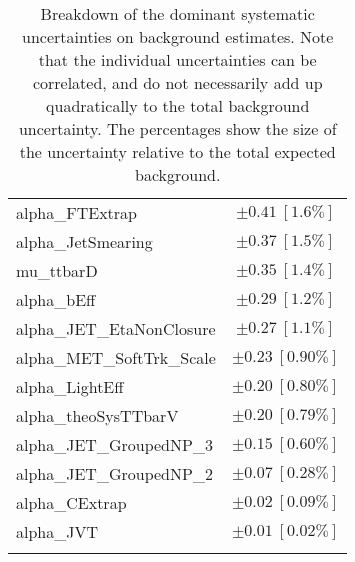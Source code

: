 \begin{table}
\begin{center}
\begin{tabular*}{\textwidth}{@{\extracolsep{\fill}}lc}
alpha\_FTExtrap         & $\pm 0.41\ [1.6\%] $       \\
alpha\_JetSmearing         & $\pm 0.37\ [1.5\%] $       \\
mu\_ttbarD         & $\pm 0.35\ [1.4\%] $       \\
alpha\_bEff         & $\pm 0.29\ [1.2\%] $       \\
alpha\_JET\_EtaNonClosure         & $\pm 0.27\ [1.1\%] $       \\
alpha\_MET\_SoftTrk\_Scale         & $\pm 0.23\ [0.90\%] $       \\
alpha\_LightEff         & $\pm 0.20\ [0.80\%] $       \\
alpha\_theoSysTTbarV         & $\pm 0.20\ [0.79\%] $       \\
alpha\_JET\_GroupedNP\_3         & $\pm 0.15\ [0.60\%] $       \\
alpha\_JET\_GroupedNP\_2         & $\pm 0.07\ [0.28\%] $       \\
alpha\_CExtrap         & $\pm 0.02\ [0.09\%] $       \\
alpha\_JVT         & $\pm 0.01\ [0.02\%] $       \\
\noalign{\smallskip}\hline\noalign{\smallskip}
\end{tabular*}
\end{center}
\caption[Breakdown of uncertainty on background estimates]{
Breakdown of the dominant systematic uncertainties on background estimates.
Note that the individual uncertainties can be correlated, and do not necessarily add up quadratically to 
the total background uncertainty. The percentages show the size of the uncertainty relative to the total expected background.
\label{table.results.bkgestimate.uncertainties.SRD_low}}
\end{table}
%